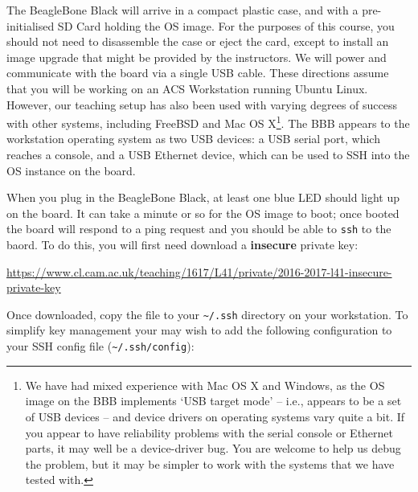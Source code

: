 \documentclass[a4paper,10pt]{article}
\newcommand{\code}[1]{\texttt{\small #1}}
\begin{document}
The BeagleBone Black will arrive in a compact plastic case, and with a
pre-initialised SD Card holding the OS image.
For the purposes of this course, you should not need to disassemble the case
or eject the card, except to install an image upgrade that might be provided
by the instructors.
We will power and communicate with the board via a single USB cable.
These directions assume that you will be working on an ACS Workstation running
Ubuntu Linux.
However, our teaching setup has also been used with varying degrees of success
with other systems, including FreeBSD and Mac OS X\footnote{We have had mixed
experience with Mac OS X and Windows, as the OS image on the BBB implements
`USB target mode' -- i.e., appears to be a set of USB devices -- and device
drivers on operating systems vary quite a bit.
If you appear to have reliability problems with the serial console or Ethernet
parts, it may well be a device-driver bug.
You are welcome to help us debug the problem, but it may be simpler to work
with the systems that we have tested with.}.
The BBB appears to the workstation operating system as two USB devices: a USB
serial port, which reaches a console, and a USB Ethernet device, which can be
used to SSH into the OS instance on the board.



When you plug in the BeagleBone Black, at least one blue LED should light up
on the board.
It can take a minute or so for the OS image to boot; once booted the
board will respond to a ping request and you should be able to \code{ssh} to the
baord.
To do this, you will first need download a \textbf{insecure} private key:

\smallskip
\noindent
{\small
\url{https://www.cl.cam.ac.uk/teaching/1617/L41/private/2016-2017-l41-insecure-private-key}
}
\smallskip

Once downloaded, copy the file to your \code{\textasciitilde/.ssh} directory
on your workstation.
To simplify key management your may wish to add the following configuration to
your SSH config file (\code{\textasciitilde/.ssh/config}):
\end{document}
